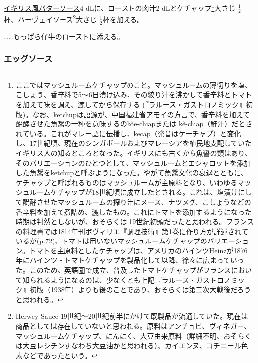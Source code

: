 \begin{recette}
\protect\hyperlink{butter-sauce}{イギリス風バターソース}4
dLに、ローストの肉汁2 dLとケチャップ\footnote{ここではマッシュルームケチャップのこと。マッシュルームの薄切りを塩、こしょう、香辛料で5〜6日漬け込み、その絞り汁を沸かして香辛料とトマトを加えて味を調え、漉してから保存する
  (『ラルース・ガストロノミック』初版)。なお、ketchupは語源が、中国福建省アモイの方言で、香辛料を加えて醗酵させた魚醤の一種を意味するのkôe-chiapまたは
  kê-chiap（鮭汁）だとされている。これがマレー語に伝播し、kecap（発音はケーチャプ）と変化し、17世紀頃、現在のシンガポールおよびマレーシアを植民地支配していたイギリス人の知るところとなった。イギリスにも古くから魚醤の類はあり、そのバリエーションのひとつとして、マッシュルームとエシャロットを添加した魚醤をketchupと呼ぶようになった。やがて魚醤文化の衰退とともに、ケチャップと呼ばれるものはマッシュルームが主原料となり、いわゆるマッシュルームケチャップが18世紀頃に成立したとされる。これは、塩漬けにして醗酵させたマッシュルームの搾り汁にメース、ナツメグ、こしょうなどの香辛料を加えて煮詰め、漉したもの。これにトマトを添加するようになった時期は判然としないが、おそらくは
  19世紀初頭だったと思われる。フランスの料理書では1814年刊ボヴィリエ『調理技術』第1巻に作り方が詳述されているが(p.72)、トマトは用いないマッシュルームケチャップのバリエーション。トマトを主原料としたケチャップは、アメリカのハインツHeinzが1876年にハインツ・トマトケチャップを製品化して以降、徐々に広まっていった。このため、英語圏で成立、普及したトマトケチャップがフランスにおいて知られるようになるのは、少なくとも上記『ラルース・ガストロノミック』初版（1938年）よりも後のことであり、おそらくは第二次大戦後だろうと思われる。}大さじ
\(\frac{1}{2}\)杯、ハーヴェイソース\footnote{Herwey Sauce
  19世紀〜20世紀前半にかけて既製品が流通していた。現在は商品としては存在していないと思われる。原料はアンチョビ、ヴィネガー、マッシュルームケチャップ、にんにく、大豆由来原料（詳細不明、おそらくは大豆レシチンすなわち大豆油かと思われる）、カイエンヌ、コチニール色素などであったという。}大さじ
\(\frac{1}{2}\)杯を加える。

\ldots{}\ldots{}もっぱら仔牛のローストに添える。

\hypertarget{eggs-sauce}{%
\subsubsection{エッグソース}\label{eggs-sauce}}




\end{recette}
